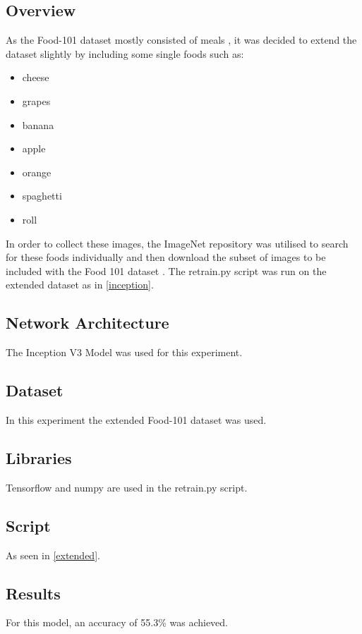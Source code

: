 \subsection*{Overview}
As the Food-101 dataset mostly consisted of meals \textcite{food101}, it was decided to extend the
dataset slightly by including some single foods such as:
\begin{itemize}
    \item{cheese}
    \item{grapes}
    \item{banana}
    \item{apple}
    \item{orange}
    \item{spaghetti}
    \item{roll}
\end{itemize}

In order to collect these images, the ImageNet repository was utilised to search for
these foods individually and then download the subset of images to be included
with the Food 101 dataset \textcite{imagenet}. The retrain.py script was run on the extended dataset as in
\ref{inception}.

\subsection*{Network Architecture}
The Inception V3 Model was used for this experiment.

\subsection*{Dataset}
In this experiment the extended Food-101 dataset was used.

\subsection*{Libraries}
Tensorflow and numpy are used in the retrain.py script.

\subsection*{Script}
As seen in \ref{extended}.

\subsection*{Results}
For this model, an accuracy of 55.3\% was achieved.

